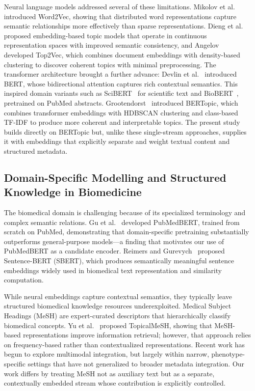 \documentclass[authorproof,JACIII,researchpaper]{fujipressarticle}
\begin{document}
{\color{red}%
Neural language models addressed several of these limitations. Mikolov et al.~\cite{mikolov_efficient_2013} introduced Word2Vec, showing that distributed word representations capture semantic relationships more effectively than sparse representations. Dieng et al.~\cite{dieng_topic_2020} proposed embedding-based topic models that operate in continuous representation spaces with improved semantic consistency, and Angelov~\cite{angelov_top2vec_2020} developed Top2Vec, which combines document embeddings with density-based clustering to discover coherent topics with minimal preprocessing. The transformer architecture brought a further advance: Devlin et al.~\cite{devlin_bert_2019} introduced BERT, whose bidirectional attention captures rich contextual semantics. This inspired domain variants such as SciBERT~\cite{beltagy_scibert_2019} for scientific text and BioBERT~\cite{lee_biobert_2020}, pretrained on PubMed abstracts. Grootendorst~\cite{grootendorst_bertopic_2022} introduced BERTopic, which combines transformer embeddings with HDBSCAN clustering and class-based TF-IDF to produce more coherent and interpretable topics. The present study builds directly on BERTopic but, unlike these single-stream approaches, supplies it with embeddings that explicitly separate and weight textual content and structured metadata.
}%

{\color{red}%
\subsection{Domain-Specific Modelling and Structured Knowledge in Biomedicine}
}%

{\color{red}%
The biomedical domain is challenging because of its specialized terminology and complex semantic relations. Gu et al.~\cite{gu_domain_2022} developed PubMedBERT, trained from scratch on PubMed, demonstrating that domain-specific pretraining substantially outperforms general-purpose models---a finding that motivates our use of PubMedBERT as a candidate encoder. Reimers and Gurevych~\cite{reimers_sentence-bert_2019} proposed Sentence-BERT (SBERT), which produces semantically meaningful sentence embeddings widely used in biomedical text representation and similarity computation.
}%

{\color{red}%
While neural embeddings capture contextual semantics, they typically leave structured biomedical knowledge resources underexploited. Medical Subject Headings (MeSH) are expert-curated descriptors that hierarchically classify biomedical concepts. Yu et al.~\cite{yu_improving_2016} proposed TopicalMeSH, showing that MeSH-based representations improve information retrieval; however, that approach relies on frequency-based rather than contextualized representations. Recent work has begun to explore multimodal integration, but largely within narrow, phenotype-specific settings that have not generalized to broader metadata integration. Our work differs by treating MeSH not as auxiliary text but as a separate, contextually embedded stream whose contribution is explicitly controlled.
}%
\end{document}
